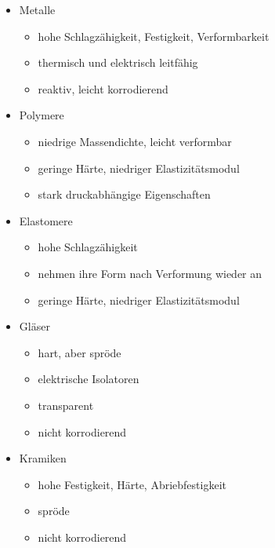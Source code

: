 \documentclass[11pt,a4paper]{article}
\numberwithin{equation}{section}
\numberwithin{figure}{section}
\begin{document}
\indent \begin{itemize}
    \item Metalle
    \begin{itemize}
        \item hohe Schlagzähigkeit, Festigkeit, Verformbarkeit
        \item thermisch und elektrisch leitfähig
        \item reaktiv, leicht korrodierend
    \end{itemize}
    \item Polymere
    \begin{itemize}
        \item  niedrige Massendichte, leicht verformbar
        \item geringe Härte, niedriger Elastizitätsmodul
        \item stark druckabhängige Eigenschaften
    \end{itemize}
    \item Elastomere
    \begin{itemize}
        \item hohe Schlagzähigkeit
        \item nehmen ihre Form nach Verformung wieder an
        \item geringe Härte, niedriger Elastizitätsmodul
    \end{itemize}
    \item Gläser
    \begin{itemize}
        \item hart, aber spröde
        \item elektrische Isolatoren
        \item transparent
        \item nicht korrodierend
    \end{itemize}
    \item Kramiken
    \begin{itemize}
        \item hohe Festigkeit, Härte, Abriebfestigkeit 
        \item spröde
        \item nicht korrodierend
    \end{itemize}
\end{itemize}
\newpage
\end{document}
